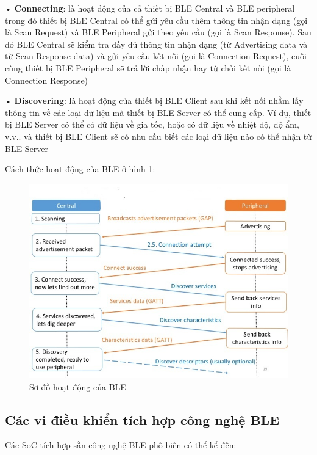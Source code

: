 • \textbf{Connecting}: là hoạt động của cả thiết bị BLE Central và BLE peripheral trong đó thiết bị BLE Central có thể gửi yêu cầu thêm thông tin nhận dạng (gọi là Scan Request) và BLE Peripheral gửi theo yêu cầu (gọi là Scan Response). Sau đó BLE Central sẽ kiểm tra đầy đủ thông tin nhận dạng (từ Advertising data và từ Scan Response data) và gửi yêu cầu kết nối (gọi là Connection Request), cuối cùng thiết bị BLE Peripheral sẽ trả lời chấp nhận hay từ chối kết nối (gọi là Connection Response)

• \textbf{Discovering}: là hoạt động của thiết bị BLE Client sau khi kết nối nhằm lấy thông tin về các loại dữ liệu mà thiết bị BLE Server có thể cung cấp. Ví dụ, thiết bị BLE Server có thể có dữ liệu về gia tốc, hoặc có dữ liệu về nhiệt độ, độ ẩm, v.v.. và thiết bị BLE Client sẽ có nhu cầu biết các loại dữ liệu nào có thể nhận từ BLE Server

Cách thức hoạt động của BLE ở hình \ref{fig: btwork}:
	\begin{figure}[h]
		\includegraphics[width=1.0\textwidth]{btwork}
		\caption[Sơ đồ hoạt động của BLE]{Sơ đồ hoạt động của BLE}
		\label{fig: btwork}
	\end{figure}
	
\newpage
\subsection{Các vi điều khiển tích hợp công nghệ BLE}
Các SoC tích hợp sẵn công nghệ BLE phố biến có thể kể đến:

